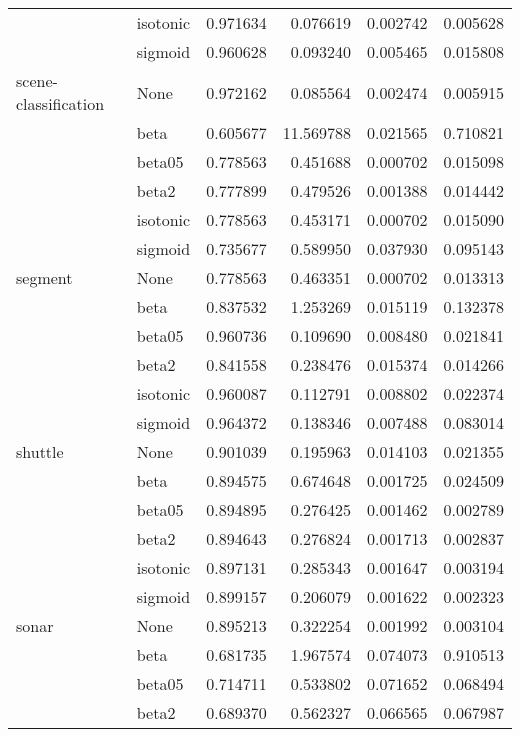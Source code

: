 \begin{tabular}{llrrrr}
        & isotonic &  0.971634 &   0.076619 &  0.002742 &  0.005628 \\
        & sigmoid &  0.960628 &   0.093240 &  0.005465 &  0.015808 \\
scene-classification & None &  0.972162 &   0.085564 &  0.002474 &  0.005915 \\
        & beta &  0.605677 &  11.569788 &  0.021565 &  0.710821 \\
        & beta05 &  0.778563 &   0.451688 &  0.000702 &  0.015098 \\
        & beta2 &  0.777899 &   0.479526 &  0.001388 &  0.014442 \\
        & isotonic &  0.778563 &   0.453171 &  0.000702 &  0.015090 \\
        & sigmoid &  0.735677 &   0.589950 &  0.037930 &  0.095143 \\
segment & None &  0.778563 &   0.463351 &  0.000702 &  0.013313 \\
        & beta &  0.837532 &   1.253269 &  0.015119 &  0.132378 \\
        & beta05 &  0.960736 &   0.109690 &  0.008480 &  0.021841 \\
        & beta2 &  0.841558 &   0.238476 &  0.015374 &  0.014266 \\
        & isotonic &  0.960087 &   0.112791 &  0.008802 &  0.022374 \\
        & sigmoid &  0.964372 &   0.138346 &  0.007488 &  0.083014 \\
shuttle & None &  0.901039 &   0.195963 &  0.014103 &  0.021355 \\
        & beta &  0.894575 &   0.674648 &  0.001725 &  0.024509 \\
        & beta05 &  0.894895 &   0.276425 &  0.001462 &  0.002789 \\
        & beta2 &  0.894643 &   0.276824 &  0.001713 &  0.002837 \\
        & isotonic &  0.897131 &   0.285343 &  0.001647 &  0.003194 \\
        & sigmoid &  0.899157 &   0.206079 &  0.001622 &  0.002323 \\
sonar & None &  0.895213 &   0.322254 &  0.001992 &  0.003104 \\
        & beta &  0.681735 &   1.967574 &  0.074073 &  0.910513 \\
        & beta05 &  0.714711 &   0.533802 &  0.071652 &  0.068494 \\
        & beta2 &  0.689370 &   0.562327 &  0.066565 &  0.067987 \\

\end{tabular}
